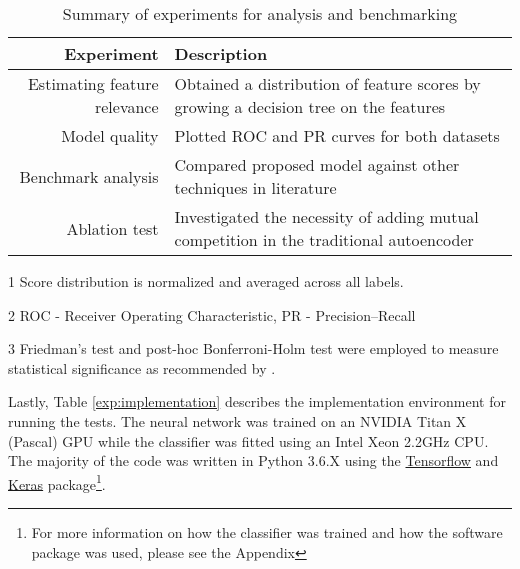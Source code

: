 \begin{table}[t]
  \centering
  \caption{Summary of experiments for analysis and benchmarking}
  \label{exp:key_results}
  \begin{threeparttable}
      \begin{tabular}{@{}rp{}@{}}
          \toprule
          Experiment                      & Description \\ \midrule
          Estimating feature relevance    & Obtained a distribution of feature scores by growing a decision tree on the features\tnote{1} \\
          Model quality         & Plotted ROC and PR curves for both
          datasets\tnote{2}\\
          Benchmark analysis     & Compared proposed model against other
          techniques in literature\tnote{3}\\
          Ablation test                   & Investigated the necessity of adding
          mutual competition in the traditional autoencoder\\\bottomrule
      \end{tabular}
  \begin{tablenotes}
      \footnotesize
      \item[1] Score distribution is normalized and averaged across all labels.
      \item[2] ROC - Receiver Operating Characteristic, PR - Precision--Recall
      \item[3] Friedman's test \parencite{friedman1937use} and post-hoc Bonferroni-Holm test \parencite{holm1979simple}
      were employed to measure statistical significance as recommended by \cite{demsar2006statistical}.
  \end{tablenotes}
  \end{threeparttable}
\end{table}

\par Lastly, Table \ref{exp:implementation} describes the implementation
environment for running the tests. The neural network was trained on an
NVIDIA Titan X (Pascal) GPU while the classifier was fitted using an Intel
Xeon 2.2GHz CPU. The majority of the code was written in Python 3.6.X using
the \href{https://www.tensorflow.org/}{Tensorflow} and
\href{https://keras.io/}{Keras} package\footnote{For more information on how
the classifier was trained and how the software package was used, please see
the Appendix}.

